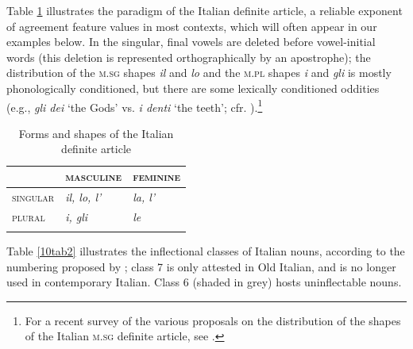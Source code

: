 \documentclass[output=paper,colorlinks,citecolor=brown]{langscibook}
\begin{document}
Table \ref{10tab1} illustrates the paradigm of the Italian definite article, a reliable exponent of agreement feature values in most contexts, which will often appear in our examples below. In the singular, final vowels are deleted before vowel-initial words (this deletion is represented orthographically by an apostrophe); the distribution of the \textsc{m.sg} shapes \emph{il} and \emph{lo} and the \textsc{m.pl} shapes \emph{i} and \emph{gli} is mostly phonologically conditioned, but
there are some lexically conditioned oddities (e.g., \emph{gli dei} `the Gods' vs. \emph{i denti} `the teeth'; cfr. \citealt[62]{maidenrobustelli2000}).\footnote{For a recent survey of the various proposals on the distribution of the shapes of the Italian \textsc{m.sg} definite article, see \citet{repetti2020}.}

\begin{table}[ht]
	\centering
	\begin{tabularx}{0.5\textwidth}{XXX}
		\lsptoprule
			& \textsc{masculine} & \textsc{feminine} \\
			\midrule
			\textsc{singular} & \emph{il, lo, l’} & \emph{la, l’} \\
			\textsc{plural} & \emph{i, gli} & \emph{le} \\
		\lspbottomrule
	\end{tabularx}
	\caption{Forms and shapes of the Italian definite article}
	\label{10tab1}
\end{table}

Table \ref{10tab2} illustrates the inflectional classes of Italian nouns, according to the numbering proposed by \citet{dachillethornton2003}; class 7 is only attested in Old Italian, and is no longer used in contemporary Italian. Class 6 (shaded in grey) hosts uninflectable nouns.
\end{document}
